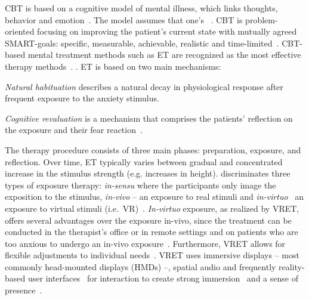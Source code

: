 \Ac{CBT} is based on a cognitive model of mental illness, which links thoughts, behavior and emotion~\cite{fenn2013}. The model assumes that one's ~\cite{beck1995}. \ac{CBT} is problem-oriented focusing on improving the patient's current state with mutually agreed SMART-goals: specific, measurable, achievable, realistic and time-limited~\cite{fenn2013}.
\ac{CBT}-based mental treatment methods such as \ac{ET} are recognized as the most effective therapy methods~\cite{emmelkamp2002, neudeck2005}. \cite{apa12}.
\ac{ET} is based on two main mechanisms: 
\begin{enumerate*}
    \item \textit{Natural habituation} describes a natural decay in physiological response after frequent exposure to the anxiety stimulus.
    \item  \textit{Cognitive revaluation} is a mechanism that comprises the patients' reflection on the exposure and their fear reaction~\cite{neudeck2005}.
\end{enumerate*}
The therapy procedure consists of three main phases: preparation, exposure, and reflection. Over time, \ac{ET} typically varies between gradual and concentrated increase in the stimulus strength (e.g. increases in height).
\citeauthor{scharfenberger2012} discriminates three types of exposure therapy: \textit{in-sensu} where the participants only image the exposition to the stimulus, \textit{in-vivo} -- an exposure to real stimuli and \textit{in-virtuo}~\cite{tisseau2008} an exposure to virtual stimuli (i.e.~\ac{VR})~\cite{scharfenberger2012}. \textit{In-virtuo} exposure, as realized by \ac{VRET}, offers several advantages over the exposure in-vivo, since the treatment can be conducted in the therapist's office or in remote settings and on patients who are too anxious to undergo an in-vivo exposure~\cite{emmelkamp2002}. Furthermore, \ac{VRET} allows for flexible adjustments to individual needs~\cite{powers2008}.
\ac{VRET} uses immersive displays -- most commonly head-mounted displays (HMDs) --, spatial audio and frequently reality-based user interfaces~\cite{jacob2008} for interaction to create strong immersion~\cite{bowman2007, slater1996, slater1997} and a sense of presence~\cite{draper1998, skarbez2017, slater2007, witmer1998}.
